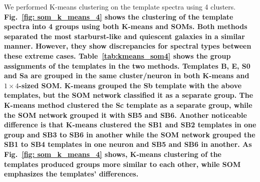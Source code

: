     We performed K-means clustering on the  template spectra using 4 clusters.
    \textbf{
    Fig.~\ref{fig: som_k_means_4} shows the clustering of the template spectra into 4 groups using both K-means and SOMs.
    Both methods separated the most starburst-like and quiescent galaxies in a similar manner.
    However, they show discrepancies for spectral types between these extreme cases.
    Table~\ref{tab:kmeans_som4} shows the group assignments of the  templates in the two methods.
    Templates B, E, S0 and Sa are grouped in the same cluster/neuron in both K-means and $1\times4$-sized SOM. 
    K-means grouped the Sb template with the above templates, but the SOM network classified it as a separate group.
    The K-means method clustered the Sc template as a separate group, while the SOM network grouped it with SB5 and SB6. 
    Another noticeable difference is that K-means clustered the SB1 and SB2 templates in one group and SB3 to SB6 in another while
    the SOM network grouped the SB1 to SB4 templates in one neuron and SB5 and SB6 in another.
    As Fig.~\ref{fig: som_k_means_4} shows, K-means clustering of the templates produced groups more similar to each other, while SOM emphasizes the templates' differences.
    }
    
